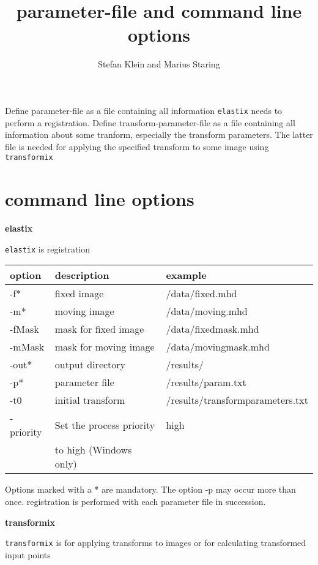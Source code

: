 \documentclass[a4paper]{article}
\title{parameter-file and command line options}
\author{Stefan Klein and Marius Staring}
\newenvironment{Tabular}[1]{\ttfamily \begin{tabular}{#1}}{\end{tabular}}
\begin{document}
\maketitle

Define parameter-file as a file containing all information \texttt{elastix} needs to perform a
registration. Define transform-parameter-file as a file containing all information about some
tranform, especially the transform parameters. The latter file is needed for applying the
specified transform to some image using \texttt{transformix}

\section{command line options}

\textbf{elastix}

\texttt{elastix} is registration

\begin{Tabular}{lll}
\rmfamily option & \rmfamily description & \rmfamily example \\
\hline
-f*      &   fixed image             &   /data/fixed.mhd \\
-m*      &   moving image            &   /data/moving.mhd \\
-fMask  &   mask for fixed image    &   /data/fixedmask.mhd \\
-mMask  &   mask for moving image   &   /data/movingmask.mhd \\
-out*    &   output directory        &   /results/ \\
-p*      &   parameter file          &   /results/param.txt \\
-t0     &   initial transform       &   /results/transformparameters.txt \\
-priority & Set the process priority & high \\
            & to high (Windows only) &
\end{Tabular}

Options marked with a * are mandatory. The option -p may occur more than once. registration is
performed with each parameter file in succession.

\textbf{transformix}

\texttt{transformix} is for applying transforms to images or for calculating transformed input
points
\end{document}
